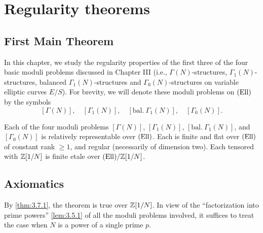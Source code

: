 \chapter{Regularity theorems}
\label{ch:5}

\section{First Main Theorem}
\label{sec:5.1}

In this chapter, we study the regularity properties of the first three of the four basic moduli problems discussed in Chapter III (i.e., $\Gamma(N)$-structures, $\Gamma_1(N)$-structures, balanced $\Gamma_1(N)$-structures and $\Gamma_0(N)$-structures on variable elliptic curves $E/S$). For brevity, we will denote these moduli problems on $(\mathrm{Ell})$ by the symbols
\[
[\Gamma(N)],\quad [\Gamma_1(N)],\quad [\mathrm{bal.}\ \Gamma_1(N)],\quad [\Gamma_0(N)].
\]

\begin{fmt}\label{thm:5.1.1}
Each of the four moduli problems $[\Gamma(N)]$, $[\Gamma_1(N)]$, $[\mathrm{bal.}\ \Gamma_1(N)]$, and $[\Gamma_0(N)]$ is relatively representable over $(\mathrm{Ell})$. Each is finite and flat over $(\mathrm{Ell})$ of constant rank $\ge 1$, and regular (necessarily of dimension two). Each tensored with $\mathbb{Z}[1/N]$ is finite etale over $(\mathrm{Ell})/\mathbb{Z}[1/N]$.
\end{fmt}

\section{Axiomatics}
\label{sec:5.2}

By \ref{thm:3.7.1}, the theorem is true over $\mathbb{Z}[1/N]$. In view of the ``factorization into prime powers'' \ref{lem:3.5.1} of all the moduli problems involved, it suffices to treat the case when $N$ is a power of a single prime $p$.

